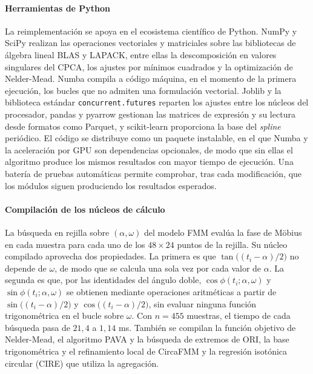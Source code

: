 \documentclass[12pt, a4paper]{report}
\begin{document}
\paragraph{Herramientas de Python}
La reimplementación se apoya en el ecosistema científico de Python. NumPy y SciPy realizan las operaciones vectoriales y matriciales sobre las bibliotecas de álgebra lineal BLAS y LAPACK, entre ellas la descomposición en valores singulares del CPCA, los ajustes por mínimos cuadrados y la optimización de Nelder-Mead. Numba compila a código máquina, en el momento de la primera ejecución, los bucles que no admiten una formulación vectorial. Joblib y la biblioteca estándar \texttt{concurrent.futures} reparten los ajustes entre los núcleos del procesador, pandas y pyarrow gestionan las matrices de expresión y su lectura desde formatos como Parquet, y scikit-learn proporciona la base del \textit{spline} periódico. El código se distribuye como un paquete instalable, en el que Numba y la aceleración por GPU son dependencias opcionales, de modo que sin ellas el algoritmo produce los mismos resultados con mayor tiempo de ejecución. Una batería de pruebas automáticas permite comprobar, tras cada modificación, que los módulos siguen produciendo los resultados esperados.

\paragraph{Compilación de los núcleos de cálculo}
La búsqueda en rejilla sobre \((\alpha,\omega)\) del modelo FMM evalúa la fase de Möbius en cada muestra para cada uno de los \(48\times24\) puntos de la rejilla. Su núcleo compilado aprovecha dos propiedades. La primera es que \(\tan\bigl((t_i-\alpha)/2\bigr)\) no depende de \(\omega\), de modo que se calcula una sola vez por cada valor de \(\alpha\). La segunda es que, por las identidades del ángulo doble, \(\cos\phi(t_i;\alpha,\omega)\) y \(\sin\phi(t_i;\alpha,\omega)\) se obtienen mediante operaciones aritméticas a partir de \(\sin\bigl((t_i-\alpha)/2\bigr)\) y \(\cos\bigl((t_i-\alpha)/2\bigr)\), sin evaluar ninguna función trigonométrica en el bucle sobre \(\omega\). Con \(n=455\) muestras, el tiempo de cada búsqueda pasa de \(21{,}4\) a \(1{,}14\) ms. También se compilan la función objetivo de Nelder-Mead, el algoritmo PAVA y la búsqueda de extremos de ORI, la base trigonométrica y el refinamiento local de CircaFMM y la regresión isotónica circular (CIRE) que utiliza la agregación.
\end{document}
